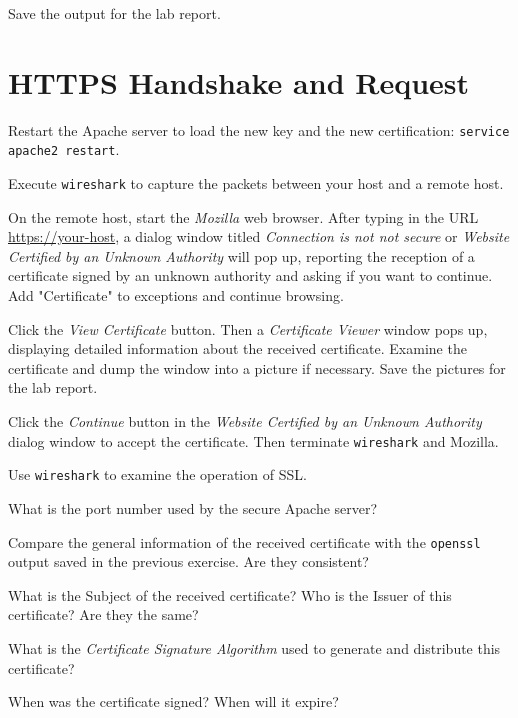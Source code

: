 \documentclass{../UTNetLab}
\begin{document}
    Save the output for the lab report.

\section{HTTPS Handshake and Request}
    Restart the Apache server to load the new key and the new certification: \lstinline{service apache2 restart}.

    Execute \lstinline{wireshark} to capture the packets between your host and a remote host.

    On the remote host, start the \textit{Mozilla} web browser.
    After typing in the URL \url{https://your-host}, a dialog window titled \textit{Connection is not not secure} or \textit{Website Certified by an Unknown Authority} will pop up, reporting the reception of a certificate signed by an unknown authority and asking if you want to continue.
    Add "Certificate" to exceptions and continue browsing.

    Click the \textit{View Certificate} button.
    Then a \textit{Certificate Viewer} window pops up, displaying detailed information about the received certificate.
    Examine the certificate and dump the window into a picture if necessary.
    Save the pictures for the lab report.

    Click the \textit{Continue} button in the \textit{Website Certified by an Unknown Authority} dialog window to accept the certificate.
    Then terminate \lstinline{wireshark} and Mozilla.

    Use \lstinline{wireshark} to examine the operation of SSL.

    \begin{report}
    \item What is the port number used by the secure Apache server?
    
    \item Compare the general information of the received certificate with the \lstinline{openssl} output saved in the previous exercise.
    Are they consistent?
    
    \item What is the Subject of the received certificate? Who is the Issuer of this certificate? Are they the same?
    
    \item What is the \textit{Certificate Signature Algorithm} used to generate and distribute this certificate?
    
    \item When was the certificate signed? When will it expire?
    \end{report}
\end{document}
